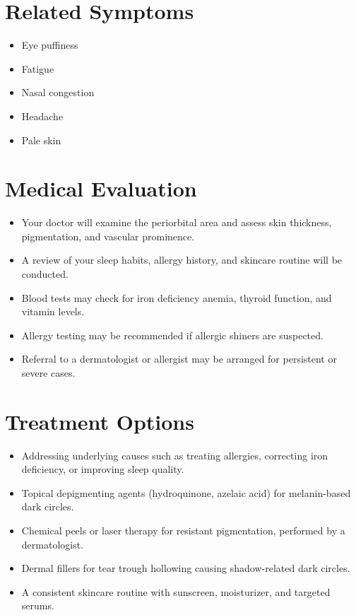 \section*{Related Symptoms}
\begin{itemize}
  \item Eye puffiness
  \item Fatigue
  \item Nasal congestion
  \item Headache
  \item Pale skin
\end{itemize}


\section*{Medical Evaluation}
\begin{itemize}
  \item Your doctor will examine the periorbital area and assess skin thickness, pigmentation, and vascular prominence.
  \item A review of your sleep habits, allergy history, and skincare routine will be conducted.
  \item Blood tests may check for iron deficiency anemia, thyroid function, and vitamin levels.
  \item Allergy testing may be recommended if allergic shiners are suspected.
  \item Referral to a dermatologist or allergist may be arranged for persistent or severe cases.
\end{itemize}

\section*{Treatment Options}
\begin{itemize}
  \item Addressing underlying causes such as treating allergies, correcting iron deficiency, or improving sleep quality.
  \item Topical depigmenting agents (hydroquinone, azelaic acid) for melanin-based dark circles.
  \item Chemical peels or laser therapy for resistant pigmentation, performed by a dermatologist.
  \item Dermal fillers for tear trough hollowing causing shadow-related dark circles.
  \item A consistent skincare routine with sunscreen, moisturizer, and targeted serums.
\end{itemize}

